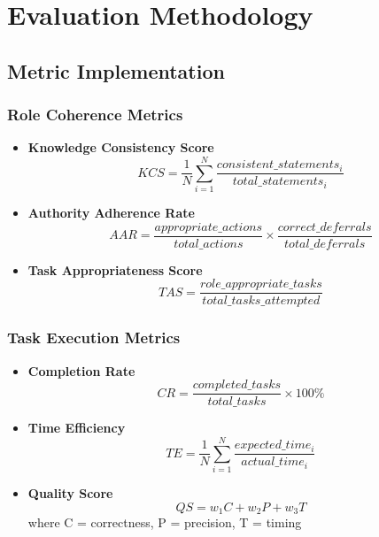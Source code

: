\documentclass{article}
\begin{document}
\section{Evaluation Methodology}
\label{sec:eval-detailed}

\subsection{Metric Implementation}

\subsubsection{Role Coherence Metrics}
\begin{itemize}
    \item \textbf{Knowledge Consistency Score}
    \begin{equation}
        KCS = \frac{1}{N}\sum_{i=1}^{N} \frac{consistent\_statements_i}{total\_statements_i}
    \end{equation}
    
    \item \textbf{Authority Adherence Rate}
    \begin{equation}
        AAR = \frac{appropriate\_actions}{total\_actions} \times \frac{correct\_deferrals}{total\_deferrals}
    \end{equation}
    
    \item \textbf{Task Appropriateness Score}
    \begin{equation}
        TAS = \frac{role\_appropriate\_tasks}{total\_tasks\_attempted}
    \end{equation}
\end{itemize}

\subsubsection{Task Execution Metrics}
\begin{itemize}
    \item \textbf{Completion Rate}
    \begin{equation}
        CR = \frac{completed\_tasks}{total\_tasks} \times 100\%
    \end{equation}
    
    \item \textbf{Time Efficiency}
    \begin{equation}
        TE = \frac{1}{N}\sum_{i=1}^{N} \frac{expected\_time_i}{actual\_time_i}
    \end{equation}
    
    \item \textbf{Quality Score}
    \begin{equation}
        QS = w_1C + w_2P + w_3T
    \end{equation}
    where C = correctness, P = precision, T = timing
\end{itemize}
\end{document}
